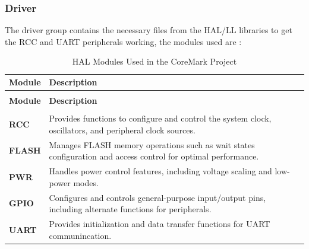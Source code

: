 \subsubsection{Driver}
The driver group contains the necessary files from the HAL/LL libraries to get the RCC and UART peripherals working, the modules used are :
\begin{xltabular}{\linewidth}{@{}>{\bfseries}l X@{}}
	\caption{HAL Modules Used in the CoreMark Project\label{tab:hal_modules}} \\
	\toprule
	\textbf{Module} & \textbf{Description} \\
	\midrule
	\endfirsthead %

	 \\
	\toprule
	\textbf{Module} & \textbf{Description} \\
	\midrule
	\endhead %

	 \\
	\endfoot %
	\bottomrule
	\endlastfoot %
    RCC & Provides functions to configure and control the system clock, oscillators, and peripheral clock sources. \\
    \midrule
    FLASH & Manages FLASH memory operations such as wait states configuration and access control for optimal performance. \\
    \midrule
    PWR & Handles power control features, including voltage scaling and low-power modes. \\
    \midrule
    GPIO & Configures and controls general-purpose input/output pins, including alternate functions for peripherals. \\
    \midrule
    UART & Provides initialization and data transfer functions for UART communincation. \\
\end{xltabular}
